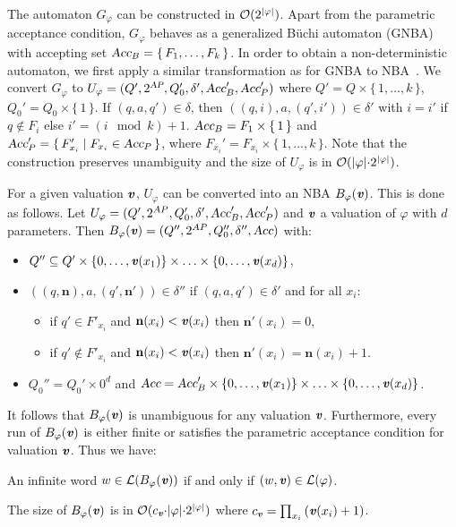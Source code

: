 \documentclass{llncs}
\newcommand{\smAP}{\mbox{\scriptsize \sl AP}}
\def\Acc{\mbox{\sl Acc}}
\newcommand{\set}[1]{\{ \, #1 \, \}}
\renewcommand{\L}{{\cal L}}
\renewcommand{\a}[1]{\textbf{\textit{#1}}}
\newcommand{\ve}{{{\a v}}}
\begin{document}
\noindent
The automaton $G_\varphi $ can be constructed in ${\cal O}(2^{|\varphi|})$. 
Apart from the parametric acceptance condition, $G_\varphi $ behaves as a generalized B\"uchi automaton (GNBA) with accepting set $\Acc_B = \set{F_1,\ldots,F_k}$.
In order to obtain a non-deterministic automaton, we first apply a similar transformation as for GNBA to NBA~\cite{DBLP:books/daglib/0020348}. 
We convert $G_\varphi $ to $U_\varphi = (Q',2^{\smAP},Q_0',\delta',\Acc_B',\Acc_P')$ where $Q' = Q \times \set{1, \ldots, k}$, $Q_0' = Q_0\times \set{1}$.
If $(q,a,q') \in \delta$, then $((q,i),a,(q',i')) \in \delta'$ with $i{=}i'$ if $q\not\in F_i$ else $i'= (i \mod k){+}1$. 
$\Acc_B= F_1\times\set{1}$ and $\Acc_P'= \set{F_{x_i}' \mid F_{x_i} \in \Acc_P}$, where $F_{x_i}'= F_{x_i} \times \set{1,\ldots,k}$. 
Note that the construction preserves unambiguity and the size of $U_\varphi$ is in ${\cal O}(|\varphi|{\cdot}2^{|\varphi|})$.


For a given valuation ${\a v}$, $U_\varphi$ can be converted into an NBA $B_\varphi({\a v})$.
This is done as follows.
Let $U_\varphi =(Q',2^{AP},Q_0',\delta',\Acc'_B,\Acc'_P)$ and ${\a v}$ a valuation of $\varphi$ with $d$ parameters.
Then $B_\varphi({\a v}) = (Q'',2^{AP},Q''_0,\delta'',\Acc)$ with:
 \begin{itemize}
  \item $Q'' \subseteq Q'\times \{0,\hdots,{\a v}(x_1)\} \times \hdots \times \{0,\hdots,{\a v}(x_d)\}$,
  \item $((q,\mathbf n),a,(q',\mathbf n')) \in \delta''$ if $(q,a,q')\in \delta'$ and for all $x_i$:
  \begin{itemize}
   \item if $q'\in F'_{x_i}$ and $\mathbf n(x_i)< {\a v}(x_i)$ then $\mathbf n'(x_i)=0$,
   \item if $q'\notin F'_{x_i}$ and $\mathbf n(x_i) <{\a v}(x_i)$ then $\mathbf n'(x_i)= \mathbf n(x_i)+1$.
  \end{itemize}
  \item $Q_0'' = Q_0'\times {0}^d$ and $\Acc =\Acc'_B \times\{0,\hdots,{\a v}(x_1)\} \times \hdots \times \{0,\hdots,{\a v}(x_d)\}$.
 \end{itemize}
It follows that $B_\varphi(\ve)$ is unambiguous for any valuation $\ve$. 
Furthermore, every run of $B_\varphi({\a v})$ is either finite or satisfies the parametric acceptance condition for valuation ${\a v}$. 
Thus we have:
\begin{proposition}
An infinite word $w \in \L(B_\varphi({\a v}))$ if and only if $(w,{\a v})\in \L(\varphi)$.
\end{proposition}
The size of $B_\varphi(\ve)$ is in ${\cal O}(c_{{\a v}}{\cdot}|\varphi|{\cdot}2^{|\varphi|})$ where $c_{{\a v}} = \prod_{x_i}\mathbf(\ve(x_i)+1)$.
\end{document}
